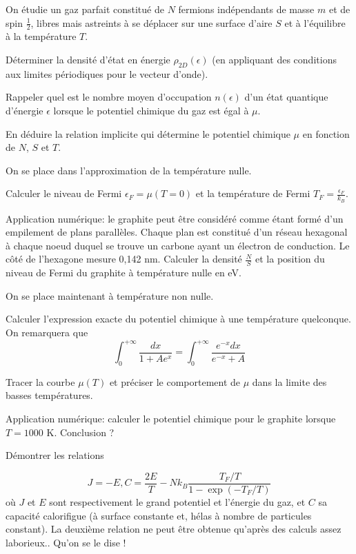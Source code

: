 On étudie un gaz parfait constitué de $N$ fermions indépendants de masse $m$ et de spin $\frac{1}{2}$, libres mais astreints à se déplacer sur une surface d'aire $S$ et à l'équilibre à la température $T$.

\question
Déterminer la densité d'état en énergie $\rho_{2D}(\epsilon)$ (en appliquant des conditions aux limites périodiques pour le vecteur d'onde). 

\question
Rappeler quel est le nombre moyen d'occupation $n(\epsilon)$ d'un état quantique d'énergie $\epsilon$ lorsque le potentiel chimique du gaz est égal à $\mu$.

\question
En déduire la relation implicite qui détermine le potentiel chimique $\mu$ en fonction de $N$, $S$ et $T$.

\medskip

On se place dans l'approximation de la température nulle.

\question
Calculer le niveau de Fermi $\epsilon_F=\mu(T=0)$ et la température de Fermi $T_F=\frac{\epsilon_F}{k_B}$.

\question
Application numérique: le graphite peut être considéré comme étant formé d'un empilement de plans parallèles. Chaque plan est constitué d'un réseau hexagonal à chaque noeud duquel se trouve un carbone ayant un électron de conduction. Le côté de l'hexagone mesure 0,142 nm. Calculer la densité $\frac{N}{S}$ et la position du niveau de Fermi du graphite à température nulle en eV.

\medskip

On se place maintenant à température non nulle.

\question
Calculer l'expression exacte du potentiel chimique à une température quelconque. On remarquera que
$$
\int_0^{+\infty} \frac{dx}{1+A e^x}=\int_0^{+\infty} \frac{e^{-x}dx}{e^{-x}+A}
$$

\question
Tracer la courbe $\mu(T)$ et préciser le comportement de $\mu$ dans la limite des basses températures.

\question
Application numérique: calculer le potentiel chimique pour le graphite lorsque $T=1000$ K. Conclusion ?

\question
Démontrer les relations

$$
J=-E,   C=\frac{2E}{T}- Nk_B\frac{T_F/T}{1-\exp(-T_F/T)}
$$
où $J$ et $E$ sont respectivement le grand potentiel et l'énergie du gaz, et $C$ sa capacité calorifigue (à surface constante et, hélas à nombre de particules constant). La deuxième relation ne peut être obtenue qu'après des calculs assez laborieux.. Qu'on se le dise !

